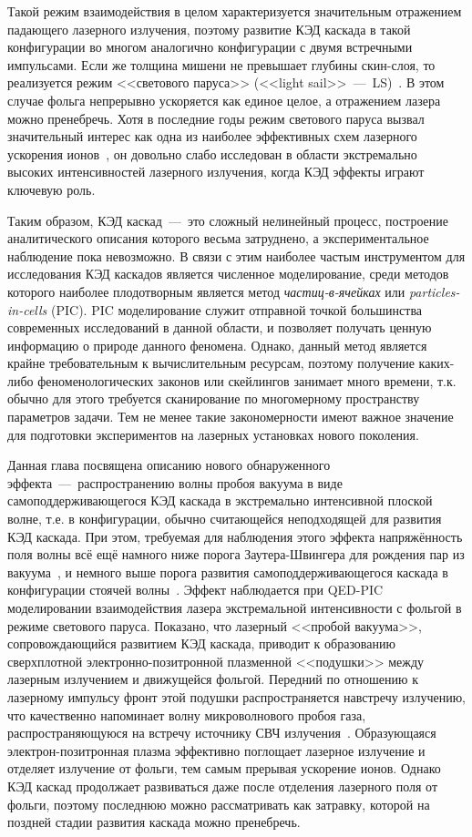 Такой режим взаимодействия в целом характеризуется значительным отражением падающего лазерного излучения, поэтому развитие КЭД каскада в такой конфигурации во многом аналогично конфигурации с двумя встречными импульсами.
Если же толщина мишени не превышает глубины скин-слоя, то реализуется режим <<светового паруса>> (<<light sail>>~---~LS)~\cite{esirkepov2004,macchi2013ion}.
В этом случае фольга непрерывно ускоряется как единое целое, а отражением лазера можно пренебречь.
Хотя в последние годы режим светового паруса вызвал значительный интерес как одна из наиболее эффективных схем лазерного ускорения ионов~\cite{Steinke2013}, он довольно слабо исследован в области экстремально высоких интенсивностей лазерного излучения, когда КЭД эффекты играют ключевую роль.

Таким образом, КЭД каскад~---~это сложный нелинейный процесс, построение аналитического описания которого весьма затруднено, а экспериментальное наблюдение пока невозможно.
В связи с этим наиболее частым инструментом для исследования КЭД каскадов является численное моделирование, среди методов которого наиболее плодотворным является метод \textit{частиц-в-ячейках} или \textit{particles-in-cells} (PIC).
PIC моделирование служит отправной точкой большинства современных исследований в данной области, и позволяет получать ценную информацию о природе данного феномена.
Однако, данный метод является крайне требовательным к вычислительным ресурсам, поэтому получение каких-либо феноменологических законов или скейлингов занимает много времени, т.к. обычно для этого требуется сканирование по многомерному пространству параметров задачи.
Тем не менее такие закономерности имеют важное значение для подготовки экспериментов на лазерных установках нового поколения.

Данная глава посвящена описанию нового обнаруженного эффекта~---~распространению волны пробоя вакуума в виде самоподдерживающегося КЭД каскада в экстремально интенсивной плоской волне, т.е. в конфигурации, обычно считающейся неподходящей для развития КЭД каскада. 
При этом, требуемая для наблюдения этого эффекта напряжённость поля волны всё ещё намного ниже порога Заутера-Швингера для рождения пар из вакуума~\cite{Sauter31, Schwinger51}, и немного выше порога развития самоподдерживающегося каскада в конфигурации стоячей волны~\cite{grismayer2017seeded}.
Эффект наблюдается при QED-PIC моделировании взаимодействия лазера экстремальной интенсивности с фольгой в режиме светового паруса.
Показано, что лазерный <<пробой вакуума>>, сопровождающийся развитием КЭД каскада, приводит к образованию сверхплотной электронно-позитронной плазменной <<подушки>> между лазерным излучением и движущейся фольгой.
Передний по отношению к лазерному импульсу фронт этой подушки распространяется навстречу излучению, что качественно напоминает волну микроволнового пробоя газа, распространяющуюся на встречу источнику СВЧ излучения~\cite{bollen1983high,semenov1982breakdown}.
Образующаяся электрон-позитронная плазма эффективно поглощает лазерное излучение и отделяет излучение от фольги, тем самым прерывая ускорение ионов.
Однако КЭД каскад продолжает развиваться даже после отделения лазерного поля от фольги, поэтому последнюю можно рассматривать как затравку, которой на поздней стадии развития каскада можно пренебречь.

